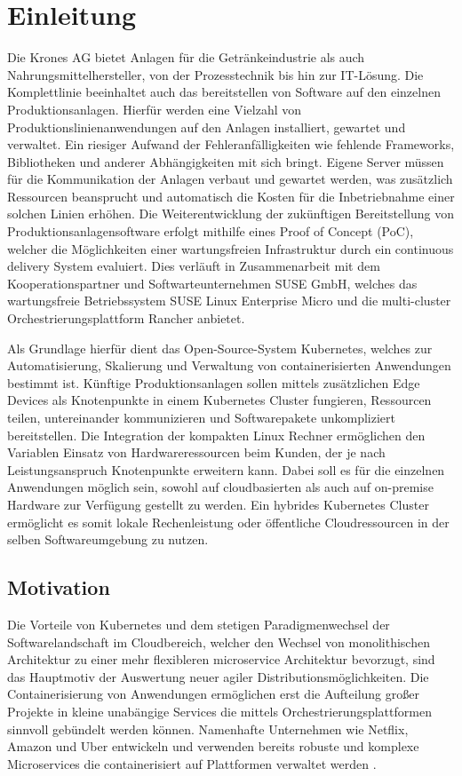 \chapter{Einleitung}
Die Krones AG bietet Anlagen für die Getränkeindustrie als auch 
Nahrungsmittelhersteller, von der Prozesstechnik bis hin zur IT-Lösung. 
Die Komplettlinie beeinhaltet auch das bereitstellen von Software auf den einzelnen Produktionsanlagen. 
Hierfür werden eine Vielzahl von Produktionslinienanwendungen auf den Anlagen installiert, gewartet
und verwaltet. Ein riesiger Aufwand der Fehleranfälligkeiten wie fehlende Frameworks, Bibliotheken
und anderer Abhängigkeiten mit sich bringt.
Eigene Server müssen für die Kommunikation der Anlagen verbaut und gewartet werden,
was zusätzlich Ressourcen beansprucht und automatisch die Kosten für die Inbetriebnahme einer solchen
Linien erhöhen. Die Weiterentwicklung der zukünftigen Bereitstellung von Produktionsanlagensoftware
erfolgt mithilfe eines Proof of Concept (PoC), welcher die Möglichkeiten einer wartungsfreien Infrastruktur
durch ein continuous delivery System evaluiert. Dies verläuft in Zusammenarbeit mit dem
Kooperationspartner und Softwarteunternehmen SUSE GmbH, welches das wartungsfreie Betriebssystem
SUSE Linux Enterprise Micro und die multi-cluster Orchestrierungsplattform Rancher anbietet.

Als Grundlage hierfür dient das Open-Source-System Kubernetes, welches zur Automatisierung, Skalierung
und Verwaltung von containerisierten Anwendungen bestimmt ist. Künftige Produktionsanlagen sollen mittels zusätzlichen Edge Devices
als Knotenpunkte in einem Kubernetes Cluster fungieren, Ressourcen teilen, untereinander kommunizieren und Softwarepakete unkompliziert bereitstellen.
Die Integration der kompakten Linux Rechner ermöglichen den Variablen Einsatz von Hardwareressourcen beim Kunden, der je nach Leistungsanspruch Knotenpunkte erweitern kann.
Dabei soll es für die einzelnen Anwendungen möglich sein, sowohl auf cloudbasierten als auch auf on-premise Hardware zur Verfügung gestellt zu werden.
Ein hybrides Kubernetes Cluster ermöglicht es somit lokale Rechenleistung oder öffentliche Cloudressourcen in der selben Softwareumgebung zu nutzen.
\section{Motivation}
Die Vorteile von Kubernetes und dem stetigen Paradigmenwechsel der Softwarelandschaft im Cloudbereich, welcher
den Wechsel von monolithischen Architektur zu einer mehr flexibleren microservice Architektur
bevorzugt, sind das Hauptmotiv der Auswertung neuer agiler Distributionsmöglichkeiten.
Die Containerisierung von Anwendungen ermöglichen erst die Aufteilung großer Projekte
in kleine unabängige Services die mittels Orchestrierungsplattformen sinnvoll gebündelt werden können.
Namenhafte Unternehmen wie Netflix, Amazon und Uber entwickeln und verwenden
bereits robuste und komplexe Microservices die containerisiert auf Plattformen
verwaltet werden \cite{microservice}. 

